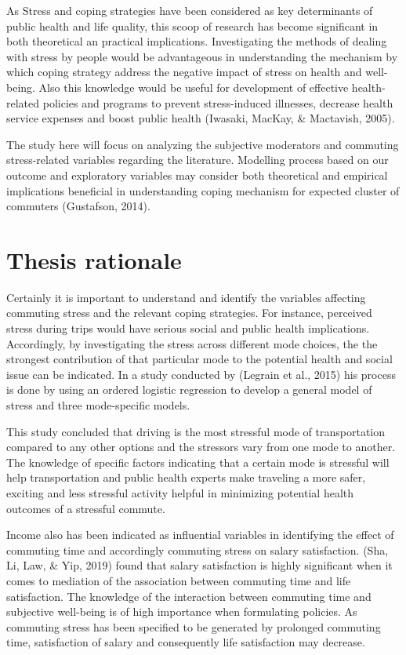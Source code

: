 \documentclass[
11pt, %
oneside, %
english, %
singlespacing, %
]{macthesis} %
\begin{document}
As Stress and coping strategies have been considered as key determinants of public health and life quality, this scoop of research has become significant in both theoretical an practical implications. Investigating the methods of dealing with stress by people would be advantageous in understanding the mechanism by which coping strategy address the negative impact of stress on health and well-being. Also this knowledge would be useful for development of effective health-related policies and programs to prevent stress-induced illnesses, decrease health service expenses and boost public health (Iwasaki, MacKay, \& Mactavish, 2005).

The study here will focus on analyzing the subjective moderators and commuting stress-related variables regarding the literature. Modelling process based on our outcome and exploratory variables may consider both theoretical and empirical implications beneficial in understanding coping mechanism for expected cluster of commuters (Gustafson, 2014).

\hypertarget{thesis-rationale}{%
\section{Thesis rationale}\label{thesis-rationale}}

Certainly it is important to understand and identify the variables affecting commuting stress and the relevant coping strategies. For instance, perceived stress during trips would have serious social and public health implications. Accordingly, by investigating the stress across different mode choices, the the strongest contribution of that particular mode to the potential health and social issue can be indicated. In a study conducted by (Legrain et al., 2015) his process is done by using an ordered logistic regression to develop a general model of stress and three mode-specific models.

This study concluded that driving is the most stressful mode of transportation compared to any other options and the stressors vary from one mode to another. The knowledge of specific factors indicating that a certain mode is stressful will help transportation and public health experts make traveling a more safer, exciting and less stressful activity helpful in minimizing potential health outcomes of a stressful commute.

Income also has been indicated as influential variables in identifying the effect of commuting time and accordingly commuting stress on salary satisfaction. (Sha, Li, Law, \& Yip, 2019) found that salary satisfaction is highly significant when it comes to mediation of the association between commuting time and life satisfaction. The knowledge of the interaction between commuting time and subjective well-being is of high importance when formulating policies. As commuting stress has been specified to be generated by prolonged commuting time, satisfaction of salary and consequently life satisfaction may decrease.
\end{document}

